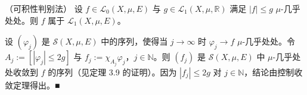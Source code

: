 \begin{theorem}

（可积性判别法） 设 $ f \in \mathcal{L}_0(X,\mu,E) $ 与 $ g \in \mathcal{L}_1(X,\mu,\mathbb{R}) $ 满足 $ |f| \le g $ $ \mu $-几乎处处。则 $ f $ 属于 $ \mathcal{L}_1(X,\mu,E) $。

\proofhead
设 $ (\varphi_j) $ 是 $ \mathcal{S}(X,\mu,E) $ 中的序列，使得当 $ j \to \infty $ 时 $ \varphi_j \to f $ $ \mu $-几乎处处。令 $ A_j := [|\varphi_j| \le 2g] $ 与 $ f_j := \chi_{A_j}\varphi_j $，$ j \in \mathbb{N} $。则 $ (f_j) $ 是 $ \mathcal{S}(X,\mu,E) $ 中 $ \mu $-几乎处处收敛到 $ f $ 的序列（见定理 3.9 的证明）。因为 $ |f_j| \le 2g $ 对 $ j \in \mathbb{N} $，结论由控制收敛定理得出。\nobreak\hspace{0.35em}■
\end{theorem}

